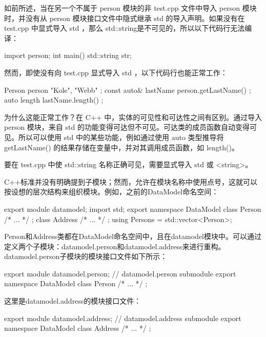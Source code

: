 
如前所述，当在另一个不属于 person 模块的非 test.cpp 文件中导入 person 模块时，并没有从 person 模块接口文件中隐式继承 std 的导入声明。如果没有在 test.cpp 中显式导入 std ，那么 std::string是不可见的，所以以下代码行无法编译：

\begin{cpp}
import person;
int main()
{
    std::string str;
}
\end{cpp}

然而，即使没有向 test.cpp 显式导入 std ，以下代码行也能正常工作：

\begin{cpp}
Person person { "Kole", "Webb" };
const auto& lastName { person.getLastName() };
auto length { lastName.length() };
\end{cpp}

为什么这能正常工作？在 C++ 中，实体的可见性和可达性之间有区别。通过导入 person 模块，来自 std 的功能变得可达但不可见。可达类的成员函数自动变得可见。所以可以使用 std 中的某些功能，例如通过使用 auto 类型推导将 getLastName() 的结果存储在变量中，并对其调用成员函数，如 length()。

要在 test.cpp 中使 std::string 名称正确可见，需要显式导入 std 或 <string>。


C++标准并没有明确提到子模块；然而，允许在模块名称中使用点号，这就可以按设想的层次结构来组织模块。例如，之前的DataModel命名空间：

\begin{cpp}
export module datamodel;
import std;
export namespace DataModel
{
    class Person { /* ... */ };
    class Address { /* ... */ };
    using Persons = std::vector<Person>;
}
\end{cpp}

Person和Address类都在DataModel命名空间中，且在datamodel模块中。可以通过定义两个子模块：datamodel.person和datamodel.address来进行重构。datamodel.person子模块的模块接口文件如下所示：

\begin{cpp}
export module datamodel.person; // datamodel.person submodule
export namespace DataModel { class Person { /* ... */ }; }
\end{cpp}

这里是datamodel.address的模块接口文件：

\begin{cpp}
export module datamodel.address; // datamodel.address submodule
export namespace DataModel { class Address { /* ... */ }; }
\end{cpp}

